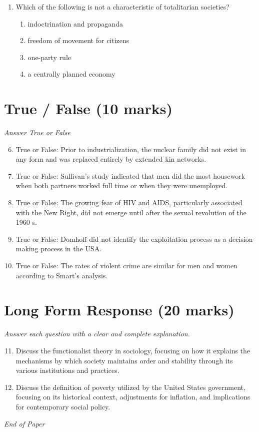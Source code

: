\documentclass[12pt]{article}
\begin{document}
\begin{enumerate}[label=\arabic*.]
\begin{enumerate}[label=(\alph*)]
    \item If all of your friends jumped off a bridge, I suppose you would too.
    \item You should be proud to be a part of this organization.
    \item If the door is closed, try the window.
    \item Once a thief, always a thief.
\end{enumerate}
\item Which of the following is not a characteristic of totalitarian societies?
\begin{enumerate}[label=(\alph*)]
    \item indoctrination and propaganda
    \item freedom of movement for citizens
    \item one-party rule
    \item a centrally planned economy
\end{enumerate}
\end{enumerate}

\section*{True / False (10 marks)}
\textit{Answer True or False}
\begin{enumerate}[label=\arabic*.]
\setcounter{enumi}{5}
\item True or False: Prior to industrialization, the nuclear family did not exist in any form and was replaced entirely by extended kin networks.
\item True or False: Sullivan's study indicated that men did the most housework when both partners worked full time or when they were unemployed.
\item True or False: The growing fear of HIV and AIDS, particularly associated with the New Right, did not emerge until after the sexual revolution of the 1960 s.
\item True or False: Domhoff did not identify the exploitation process as a decision-making process in the USA.
\item True or False: The rates of violent crime are similar for men and women according to Smart's analysis.
\end{enumerate}

\section*{Long Form Response (20 marks)}
\textit{Answer each question with a clear and complete explanation.}
\begin{enumerate}[label=\arabic*.]
\setcounter{enumi}{10}
\item Discuss the functionalist theory in sociology, focusing on how it explains the mechanisms by which society maintains order and stability through its various institutions and practices.
\item Discuss the definition of poverty utilized by the United States government, focusing on its historical context, adjustments for inflation, and implications for contemporary social policy.
\end{enumerate}

\vfill
\noindent\textit{End of Paper}
\end{document}
